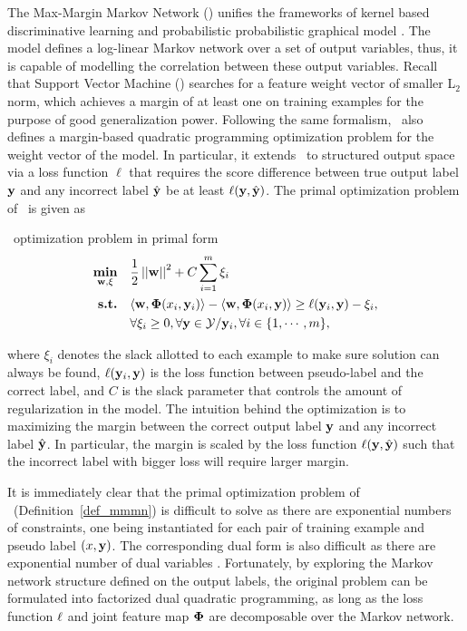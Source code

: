 The Max-Margin Markov Network (\mmmn) unifies the frameworks of kernel based discriminative learning and probabilistic probabilistic graphical model \citep{taskar04}.
The model defines a log-linear Markov network over a set of output variables, thus, it is capable of modelling the correlation between these output variables.
Recall that Support Vector Machine (\svm) searches for a feature weight vector of smaller L$_2$ norm, which achieves a margin of at least one on training examples for the purpose of good generalization power.
Following the same formalism, \mmmn\ also defines a margin-based quadratic programming optimization problem for the weight vector of the model.
In particular, it extends \svm\ to structured output space via a loss function $\ell$ that requires the score difference between true output label $\mathbf {y}$ and any incorrect label $\hat{\mathbf {y}}$ be at least $\mathbf {\ell}(\mathbf {y},\hat{\mathbf {y}})$.
The primal optimization problem of \mmmn\ is given as
\begin{definition}{\mmmn\ optimization problem in primal form}\label{def_mmmn}
	\begin{align*}
		\underset{\mathbf {w},\mathbf{\xi}}{\textbf{min}} & \quad\frac{1}{2}\left|\left| \mathbf {w} \right|\right|^2 + C\sum_{i=1}^{m}\xi_i \\
		\textbf{s.t.} & \quad\langle \mathbf {w}, \mathbf{\Phi}(x_i,\mathbf {y}_i) \rangle - \langle \mathbf {w}, \mathbf{\Phi}(x_i,\mathbf {y}) \rangle \ge \mathbf {\ell}(\mathbf {y}_i,\mathbf {y})-\xi_i,\\
		& \quad \forall \xi_i\ge0, \forall \mathbf {y}\in\mathcal{Y}/\mathbf {y}_i, \forall i\in\{1,\cdots,m\},
	\end{align*}
\end{definition}
where $\xi_i$ denotes the slack allotted to each example to make sure solution can always be found, $\mathbf {\ell}(\mathbf {y}_i,\mathbf {y})$ is the loss function between pseudo-label and the correct label, and $C$ is the slack parameter that controls the amount of regularization in the model.
The intuition behind the optimization is to maximizing the margin between the correct output label $\mathbf {y}$ and any incorrect label $\hat{\mathbf {y}}$.
In particular, the margin is scaled by the loss function $\mathbf {\ell}(\mathbf {y},\hat{\mathbf {y}})$ such that the incorrect label with bigger loss will require larger margin. 

It is immediately clear that the primal optimization problem of \mmmn\ (Definition~\ref{def_mmmn}) is difficult to solve as there are exponential numbers of constraints, one being instantiated for each pair of training example and pseudo label $(x,\mathbf {y})$.
The corresponding dual form is also difficult as there are exponential number of dual variables \cite[p.~4]{taskar04}.
Fortunately, by exploring the Markov network structure defined on the output labels, the original problem can be formulated into factorized dual quadratic programming, as long as the loss function $\mathbf {\ell}$ and joint feature map $\mathbf{\Phi}$ are decomposable over the Markov network.

